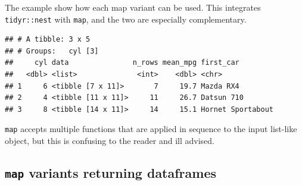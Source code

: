 \documentclass[]{book}
\newenvironment{Shaded}{}{}
\newcommand{\CommentTok}[1]{\textcolor[rgb]{0.38,0.63,0.69}{\textit{#1}}}
\newcommand{\DataTypeTok}[1]{\textcolor[rgb]{0.56,0.13,0.00}{#1}}
\newcommand{\KeywordTok}[1]{\textcolor[rgb]{0.00,0.44,0.13}{\textbf{#1}}}
\newcommand{\NormalTok}[1]{#1}
\newcommand{\OperatorTok}[1]{\textcolor[rgb]{0.40,0.40,0.40}{#1}}
\newcommand{\StringTok}[1]{\textcolor[rgb]{0.25,0.44,0.63}{#1}}
\begin{document}
The example show how each map variant can be used. This integrates \texttt{tidyr::nest} with \texttt{map}, and the two are especially complementary.

\begin{Shaded}
\end{Shaded}

\begin{verbatim}
## # A tibble: 3 x 5
## # Groups:   cyl [3]
##     cyl data               n_rows mean_mpg first_car        
##   <dbl> <list>              <int>    <dbl> <chr>            
## 1     6 <tibble [7 x 11]>       7     19.7 Mazda RX4        
## 2     4 <tibble [11 x 11]>     11     26.7 Datsun 710       
## 3     8 <tibble [14 x 11]>     14     15.1 Hornet Sportabout
\end{verbatim}

\texttt{map} accepts multiple functions that are applied in sequence to the input list-like object, but this is confusing to the reader and ill advised.

\hypertarget{map-variants-returning-dataframes}{%
\subsection{\texorpdfstring{\texttt{map} variants returning dataframes}{map variants returning dataframes}}\label{map-variants-returning-dataframes}}
\end{document}
